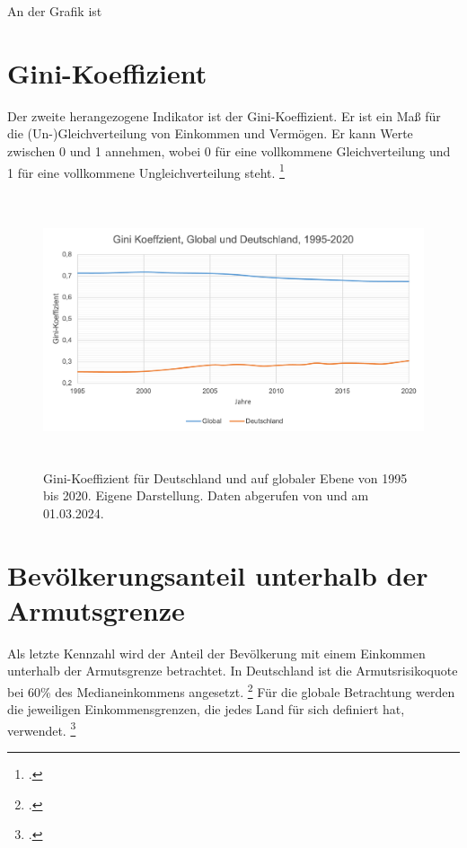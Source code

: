 An der Grafik ist 

\section{Gini-Koeffizient}

Der zweite herangezogene Indikator ist der Gini-Koeffizient. Er ist ein Ma{\ss} für die (Un-)Gleichverteilung von Einkommen und Vermögen. Er kann Werte zwischen 0 und 1 annehmen, wobei 0 für eine vollkommene Gleichverteilung und 1 für eine vollkommene Ungleichverteilung steht. \footcite[Vgl.][]{gini_definition_diw_2024}

\begin{figure}[H]
    \centering
    \includegraphics[height=8cm]{Bilder/Gini-Koeffizient2.png}
    \caption[Gini-Koeffizient, Deutschland und global, 1995-2020]{Gini-Koeffizient für Deutschland und auf globaler Ebene von 1995 bis 2020. Eigene Darstellung. Daten abgerufen von \cite[][, S.56 (global)]{wir_2022} und \cite[][(Deutschland)]{bmas_arb_gini_2020} am 01.03.2024.}
    \label{fig:iso_norm}
\end{figure}

\section{Bevölkerungsanteil unterhalb der Armutsgrenze}

Als letzte Kennzahl wird der Anteil der Bevölkerung mit einem Einkommen unterhalb der Armutsgrenze betrachtet. In Deutschland ist die Armutsrisikoquote bei 60\% des Medianeinkommens angesetzt. \footcite[Vgl.][]{bmas_arb_armutsrisikoquote_2023} Für die globale Betrachtung werden die jeweiligen Einkommensgrenzen, die jedes Land für sich definiert hat, verwendet. \footcite[Vgl.][]{wb_armutsquote_global_2022}

